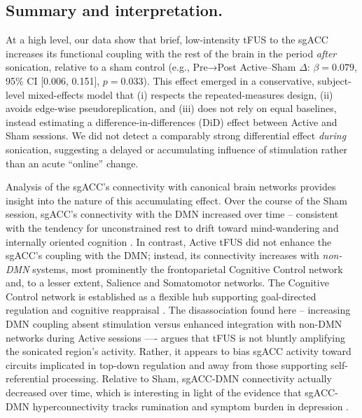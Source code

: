 \subsection*{Summary and interpretation.}
\noindent
At a high level, our data show that brief, low-intensity tFUS to the sgACC increases its functional coupling with the rest of the brain in the period \emph{after} sonication, relative to a sham control (e.g., Pre→Post Active–Sham $\Delta$: $\beta=0.079$, 95\% CI [0.006, 0.151], $p=0.033$). This effect emerged in a conservative, subject-level mixed-effects model that (i) respects the repeated-measures design, (ii) avoids edge-wise pseudoreplication, and (iii) does not rely on equal baselines, instead estimating a difference-in-differences (DiD) effect between Active and Sham sessions. We did not detect a comparably strong differential effect \emph{during} sonication, suggesting a delayed or accumulating influence of stimulation rather than an acute ``online'' change.

Analysis of the sgACC's connectivity with canonical brain networks provides insight into the nature of this accumulating effect. Over the course of the Sham session, sgACC's connectivity with the DMN increased over time -- consistent with the tendency for unconstrained rest to drift toward mind-wandering and internally oriented cognition \cite{Raichle2001,Mason2007,Christoff2009}. In contrast, Active tFUS did not enhance the sgACC's coupling with the DMN; instead, its connectivity increases with \emph{non-DMN} systems, most prominently the frontoparietal Cognitive Control network and, to a lesser extent, Salience and Somatomotor networks. The Cognitive Control network is established as a flexible hub supporting goal-directed regulation and cognitive reappraisal \cite{yeo2011organization,cole2013multi}. The disassociation found here -- increasing DMN coupling absent stimulation versus enhanced integration with non-DMN networks during Active sessions —- argues that tFUS is not bluntly amplifying the sonicated region's activity. Rather, it appears to bias sgACC activity toward circuits implicated in top-down regulation and away from those supporting self-referential processing. Relative to Sham, sgACC-DMN connectivity actually decreased over time, which is interesting in light of the evidence that sgACC-DMN hyperconnectivity tracks rumination and symptom burden in depression \cite{whitfield2012default}.

